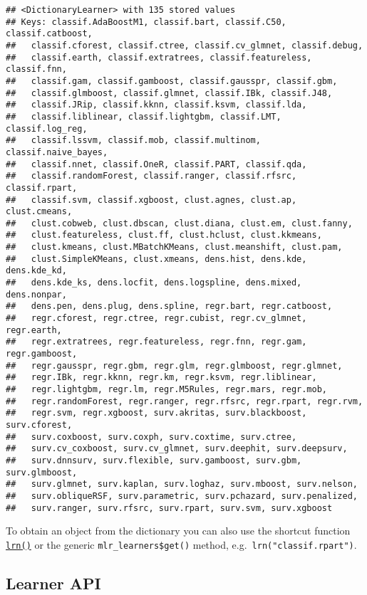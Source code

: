 \documentclass[
]{scrbook}
\begin{document}
\begin{verbatim}
## <DictionaryLearner> with 135 stored values
## Keys: classif.AdaBoostM1, classif.bart, classif.C50, classif.catboost,
##   classif.cforest, classif.ctree, classif.cv_glmnet, classif.debug,
##   classif.earth, classif.extratrees, classif.featureless, classif.fnn,
##   classif.gam, classif.gamboost, classif.gausspr, classif.gbm,
##   classif.glmboost, classif.glmnet, classif.IBk, classif.J48,
##   classif.JRip, classif.kknn, classif.ksvm, classif.lda,
##   classif.liblinear, classif.lightgbm, classif.LMT, classif.log_reg,
##   classif.lssvm, classif.mob, classif.multinom, classif.naive_bayes,
##   classif.nnet, classif.OneR, classif.PART, classif.qda,
##   classif.randomForest, classif.ranger, classif.rfsrc, classif.rpart,
##   classif.svm, classif.xgboost, clust.agnes, clust.ap, clust.cmeans,
##   clust.cobweb, clust.dbscan, clust.diana, clust.em, clust.fanny,
##   clust.featureless, clust.ff, clust.hclust, clust.kkmeans,
##   clust.kmeans, clust.MBatchKMeans, clust.meanshift, clust.pam,
##   clust.SimpleKMeans, clust.xmeans, dens.hist, dens.kde, dens.kde_kd,
##   dens.kde_ks, dens.locfit, dens.logspline, dens.mixed, dens.nonpar,
##   dens.pen, dens.plug, dens.spline, regr.bart, regr.catboost,
##   regr.cforest, regr.ctree, regr.cubist, regr.cv_glmnet, regr.earth,
##   regr.extratrees, regr.featureless, regr.fnn, regr.gam, regr.gamboost,
##   regr.gausspr, regr.gbm, regr.glm, regr.glmboost, regr.glmnet,
##   regr.IBk, regr.kknn, regr.km, regr.ksvm, regr.liblinear,
##   regr.lightgbm, regr.lm, regr.M5Rules, regr.mars, regr.mob,
##   regr.randomForest, regr.ranger, regr.rfsrc, regr.rpart, regr.rvm,
##   regr.svm, regr.xgboost, surv.akritas, surv.blackboost, surv.cforest,
##   surv.coxboost, surv.coxph, surv.coxtime, surv.ctree,
##   surv.cv_coxboost, surv.cv_glmnet, surv.deephit, surv.deepsurv,
##   surv.dnnsurv, surv.flexible, surv.gamboost, surv.gbm, surv.glmboost,
##   surv.glmnet, surv.kaplan, surv.loghaz, surv.mboost, surv.nelson,
##   surv.obliqueRSF, surv.parametric, surv.pchazard, surv.penalized,
##   surv.ranger, surv.rfsrc, surv.rpart, surv.svm, surv.xgboost
\end{verbatim}

To obtain an object from the dictionary you can also use the shortcut function \href{https://mlr3.mlr-org.com/reference/mlr_sugar.html}{\texttt{lrn()}} or the generic \texttt{mlr\_learners\$get()} method, e.g.~\texttt{lrn("classif.rpart")}.

\hypertarget{learner-api}{%
\subsection{Learner API}\label{learner-api}}
\end{document}
